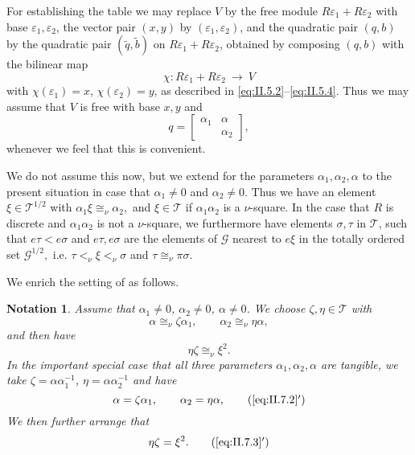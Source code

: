 \documentclass [12pt,a4paper,reqno]{amsart}
\newtheorem{notation}[thm]{Notation}
\begin{document}
For establishing the table we may replace $V$ by the free module $R {\varepsilon}_1 + R {\varepsilon}_2$ with base ${\varepsilon}_1, {\varepsilon}_2$, the vector pair $(x,y)$ by $({\varepsilon}_1, {\varepsilon}_2)$, and the quadratic pair $(q,b)$ by the quadratic pair $({\tilde q}, {\tilde b})$ on $R {\varepsilon}_1 + R {\varepsilon}_2$, obtained by composing $(q,b)$ with the bilinear map $$\chi : R {\varepsilon}_1 + R {\varepsilon}_2 {\ {\to} \ } V$$  with $\chi({\varepsilon}_1) = x$, $\chi({\varepsilon}_2) = y$, as described in \eqref{eq:II.5.2}--\eqref{eq:II.5.4}. Thus we may assume that $V$ is free with base $x,y$ and $$ q = \begin{bmatrix} {\alpha}_1& {\alpha}\\   &   {\alpha}_2\end{bmatrix}, $$
whenever we feel that this is convenient.

We do not  assume this now, but we extend \cite[Convention 7.10]{QF1} for  the parameters ${\alpha}_1, {\alpha}_2, {\alpha}$ to the present situation in case that ${\alpha}_1 \neq 0$  and ${\alpha}_2 \neq 0$. Thus we have an element ${\xi} \in {\mathcal T}^{1/2}$ with ${\alpha}_1 {\xi} \cong_\nu {\alpha}_2, $ and ${\xi} \in {\mathcal T}$ if ${\alpha}_1 {\alpha}_2$ is a $\nu$-square. In the case that $R$ is discrete and ${\alpha}_1 {\alpha}_2$ is not a $\nu$-square, we furthermore  have elements ${\sigma}, \tau$ in ${\mathcal T}$, such that $e \tau < e {\sigma}$ and $e \tau, e{\sigma}$ are the elements of ${\mathcal G}$ nearest to $e {\xi}$ in the totally ordered set ${\mathcal G}^{1/2},$ i.e. $\tau <_\nu {\xi} <_\nu {\sigma}$ and $\tau \cong_\nu \pi {\sigma}.$

We enrich the setting of  \cite[Convention 7.10]{QF1} as follows.

\begin{notation}\label{notat:II.7.1} Assume that ${\alpha}_1 \neq 0$, ${\alpha}_2 \neq 0$, ${\alpha} \neq 0$.
We choose ${\zeta}, \eta \in {\mathcal T} $ with
  \begin{equation}\label{eq:II.7.2}
  {\alpha} \cong_\nu {\zeta} {\alpha}_1, \qquad {\alpha}_2 \cong_\nu \eta {\alpha},
  \end{equation}
and then have
  \begin{equation}\label{eq:II.7.3}
  \eta {\zeta}  \cong_\nu {\xi}^2.
  \end{equation}
In the important special case  that all  three  parameters ${\alpha}_1, {\alpha}_2, {\alpha}$ are tangible, we take ${\zeta} = {\alpha} {\alpha}_1^{-1}$, $\eta =  {\alpha} {\alpha}_2^{-1}$ and have
\begin{equation}
  {\alpha} = {\zeta} {\alpha}_1, \qquad {\alpha}_2 = \eta {\alpha},
\tag{\ref{eq:II.7.2}$'$}\end{equation}
We then further arrange that
\begin{equation}
  \eta {\zeta} =  {\xi}^2.
\tag{\ref{eq:II.7.3}$'$}\end{equation}

\end{notation}
\end{document}
